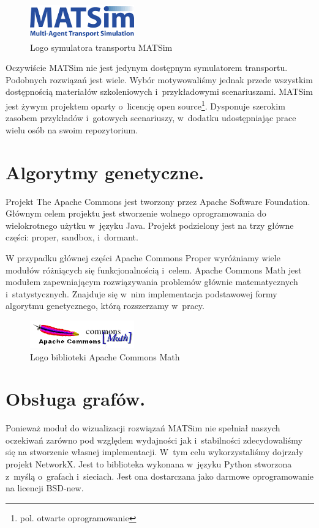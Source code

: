 \documentclass[twoside,12pt]{report}
\begin{document}
\begin{figure}[ht]
\centering
\includegraphics[width=0.40\textwidth]{img/matsim}
\caption{Logo symulatora transportu MATSim} 
\end{figure}

Oczywiście MATSim nie jest jedynym dostępnym symulatorem transportu. Podobnych rozwiązań jest wiele. Wybór motywowaliśmy jednak przede wszystkim dostępnością materiałów szkoleniowych i~przykładowymi scenariuszami. MATSim jest żywym projektem oparty o~licencję open source\footnote{pol. otwarte oprogramowanie}. Dysponuje szerokim zasobem przykładów i~gotowych scenariuszy, w~dodatku udostępniając prace wielu osób na swoim repozytorium.

\section{Algorytmy genetyczne.}

Projekt The Apache Commons jest tworzony przez Apache Software Foundation. Głównym celem projektu jest stworzenie wolnego oprogramowania do wielokrotnego użytku w~języku Java. Projekt podzielony jest na trzy główne części: proper, sandbox, i~dormant\cite{math}.

W przypadku głównej części Apache Commons Proper wyróżniamy wiele modułów różniących się funkcjonalnością i~celem. Apache Commons Math jest modułem zapewniającym rozwiązywania problemów głównie matematycznych i~statystycznych. Znajduje się w~nim implementacja podstawowej formy algorytmu genetycznego, którą rozszerzamy w~pracy.

\begin{figure}[ht]
\centering
\includegraphics[width=0.40\textwidth]{img/math}
\caption{Logo biblioteki Apache Commons Math} 
\end{figure}

\section{Obsługa grafów.}

Ponieważ moduł do wizualizacji rozwiązań MATSim nie spełniał naszych oczekiwań zarówno pod względem wydajności jak i~stabilności zdecydowaliśmy się na stworzenie własnej implementacji. W~tym celu wykorzystaliśmy dojrzały projekt NetworkX. Jest to biblioteka wykonana w~języku Python stworzona z~myślą o~grafach i~sieciach. Jest ona dostarczana jako darmowe oprogramowanie na licencji BSD-new\cite{networkx}. 
\end{document}
